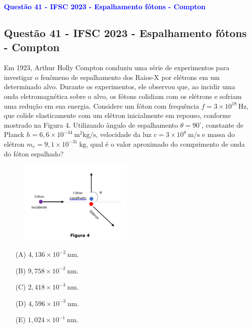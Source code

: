 \begin{flushleft}
\textbf{\textcolor{blue}{\Large Quest\~ao 41 - IFSC 2023 - Espalhamento f\'otons - Compton}}\\
\noindent

\subsection{Quest\~ao 41 - IFSC 2023 - Espalhamento f\'otons - Compton}
Em 1923, Arthur Holly Compton conduziu uma série de experimentos para investigar o fenômeno de espalhamento dos Raios-X por elétrons 
em um determinado alvo. Durante os experimentos, ele observou que, ao incidir uma onda eletromagnética sobre o alvo, os fótons colidiam 
com os elétrons e sofriam uma redução em sua energia. Considere um fóton com frequência $f=3\times10^{18}\ \text{Hz}$, que colide elasticamente 
com um elétron inicialmente em repouso, conforme mostrado na Figura 4. Utilizando ângulo de espalhamento $\theta=90^\circ$, 
constante de Planck $h=6{,}6\times10^{-34}\ \mathrm{m^2kg/s}$, velocidade da luz $c=3\times10^8\ \mathrm{m/s}$ e massa do elétron 
$m_e=9{,}1\times10^{-31}\ \mathrm{kg}$, qual é o valor aproximado do comprimento de onda do fóton espalhado?

\begin{figure}
    \centering
    \includegraphics[width=0.5\textwidth]{figures/compton-foton.png}
\end{figure}

\begin{itemize}
\item[(A)] $4{,}136\times10^{-2}\ \mathrm{nm}.$
\item[(B)] $9{,}758\times10^{-2}\ \mathrm{nm}.$
\item[(C)] $2{,}418\times10^{-3}\ \mathrm{nm}.$
\item[(D)] $4{,}596\times10^{-3}\ \mathrm{nm}.$
\item[(E)] $1{,}024\times10^{-1}\ \mathrm{nm}.$
\end{itemize}


\end{flushleft}
